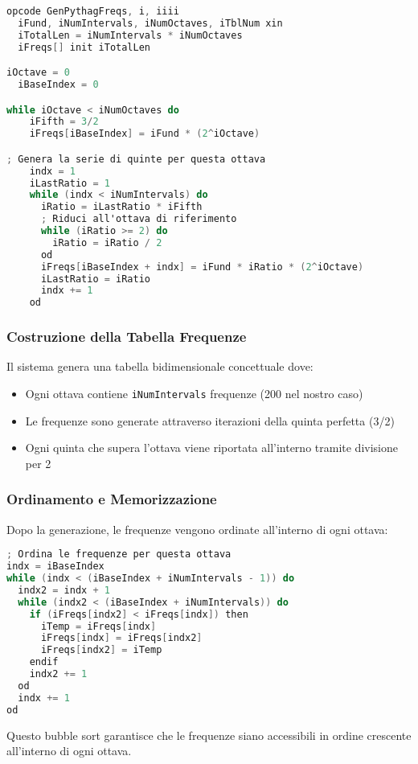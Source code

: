 \begin{lstlisting}[language=C]
opcode GenPythagFreqs, i, iiii
  iFund, iNumIntervals, iNumOctaves, iTblNum xin
  iTotalLen = iNumIntervals * iNumOctaves
  iFreqs[] init iTotalLen

iOctave = 0
  iBaseIndex = 0

while iOctave < iNumOctaves do
    iFifth = 3/2
    iFreqs[iBaseIndex] = iFund * (2^iOctave)

; Genera la serie di quinte per questa ottava
    indx = 1
    iLastRatio = 1
    while (indx < iNumIntervals) do
      iRatio = iLastRatio * iFifth
      ; Riduci all'ottava di riferimento
      while (iRatio >= 2) do
        iRatio = iRatio / 2
      od
      iFreqs[iBaseIndex + indx] = iFund * iRatio * (2^iOctave)
      iLastRatio = iRatio
      indx += 1
    od
\end{lstlisting}
\subsubsection{Costruzione della Tabella Frequenze}
Il sistema genera una tabella bidimensionale concettuale dove:
\begin{itemize}
    \item Ogni ottava contiene \texttt{iNumIntervals} frequenze (200 nel nostro caso)
    \item Le frequenze sono generate attraverso iterazioni della quinta perfetta (3/2)
    \item Ogni quinta che supera l'ottava viene riportata all'interno tramite divisione per 2
\end{itemize}
\subsubsection{Ordinamento e Memorizzazione}
Dopo la generazione, le frequenze vengono ordinate all'interno di ogni ottava:

\begin{lstlisting}[language=C]
; Ordina le frequenze per questa ottava
indx = iBaseIndex
while (indx < (iBaseIndex + iNumIntervals - 1)) do
  indx2 = indx + 1
  while (indx2 < (iBaseIndex + iNumIntervals)) do
    if (iFreqs[indx2] < iFreqs[indx]) then
      iTemp = iFreqs[indx]
      iFreqs[indx] = iFreqs[indx2]
      iFreqs[indx2] = iTemp
    endif
    indx2 += 1
  od
  indx += 1
od
\end{lstlisting}

Questo bubble sort garantisce che le frequenze siano accessibili in ordine crescente all'interno di ogni ottava.
